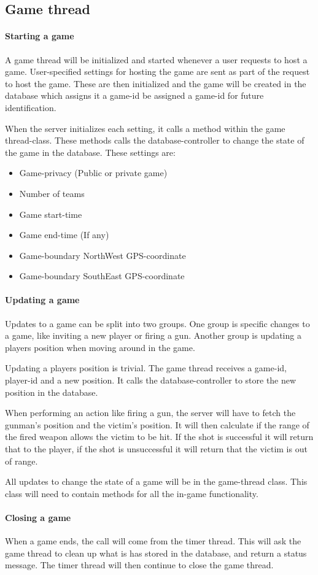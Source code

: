 \subsection{Game thread}
\paragraph{Starting a game}
A game thread will be initialized and started whenever a user requests to host a game. User-specified settings for hosting the game are sent as part of the request to host the game. These are then initialized and the game will be created in the database which assigns it a game-id be assigned a game-id for future identification.

When the server initializes each setting, it calls a method within the game thread-class. These methods calls the database-controller to change the state of the game in the database. These settings are:
\begin{itemize}
\item Game-privacy (Public or private game)
\item Number of teams
\item Game start-time
\item Game end-time (If any)
\item Game-boundary NorthWest GPS-coordinate
\item Game-boundary SouthEast GPS-coordinate
\end{itemize}

\paragraph{Updating a game}
Updates to a game can be split into two groups. One group is specific changes to a game, like inviting a new player or firing a gun. Another group is updating a players position when moving around in the game.

Updating a players position is trivial. The game thread receives a game-id, player-id and a new position. It calls the database-controller to store the new position in the database.

When performing an action like firing a gun, the server will have to fetch the gunman's position and the victim's position. It will then calculate if the range of the fired weapon allows the victim to be hit. If the shot is successful it will return that to the player, if the shot is unsuccessful it will return that the victim is out of range. 

All updates to change the state of a game will be in the game-thread class. This class will need to contain methods for all the in-game functionality. 

\paragraph{Closing a game}
When a game ends, the call will come from the timer thread. This will ask the game thread to clean up what is has stored in the database, and return a status message. The timer thread will then continue to close the game thread. 